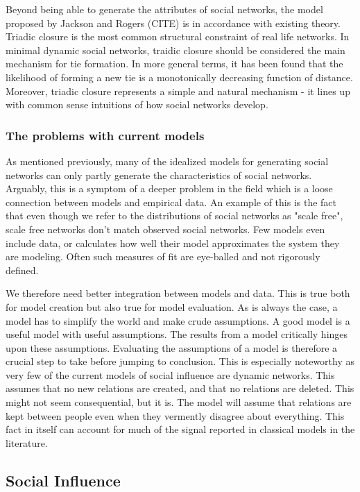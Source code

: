 \documentclass[9pt,twocolumn,twoside]{ilcss}
\begin{document}
Beyond being able to generate the attributes of social networks, the model proposed by Jackson and Rogers (CITE) is in accordance with existing theory. 
Triadic closure is the most common structural constraint of real life networks. In minimal dynamic social networks, traidic closure should be considered the main mechanism for tie formation. 
In more general terms, it has been found that the likelihood of forming a new tie is a monotonically decreasing function of distance. 
Moreover, triadic closure represents a simple and natural mechanism - it lines up with common sense intuitions of how social networks develop. 

\subsubsection{The problems with current models}

As mentioned previously, many of the idealized models for generating social networks can only partly generate the characteristics of social networks.
Arguably, this is a symptom of a deeper problem in the field which is a loose connection between models and empirical data.
An example of this is the fact that even though we refer to the distributions of social networks as "scale free", scale free networks don't match observed social networks. 
Few models even include data, or calculates how well their model approximates the system they are modeling. 
Often such measures of fit are eye-balled and not rigorously defined. 

We therefore need better integration between models and data. This is true both for model creation but also true for model evaluation. 
As is always the case, a model has to simplify the world and make crude assumptions. A good model is a useful model with useful assumptions. 
The results from a model critically hinges upon these assumptions. Evaluating the assumptions of a model is therefore a crucial step to take before jumping to conclusion.
This is especially noteworthy as very few of the current models of social influence are dynamic networks. 
This assumes that no new relations are created, and that no relations are deleted. 
This might not seem consequential, but it is. The model will assume that relations are kept between people even when they vermently disagree about everything.
This fact in itself can account for much of the signal reported in classical models in the literature. 

\subsection{Social Influence}
\end{document}

